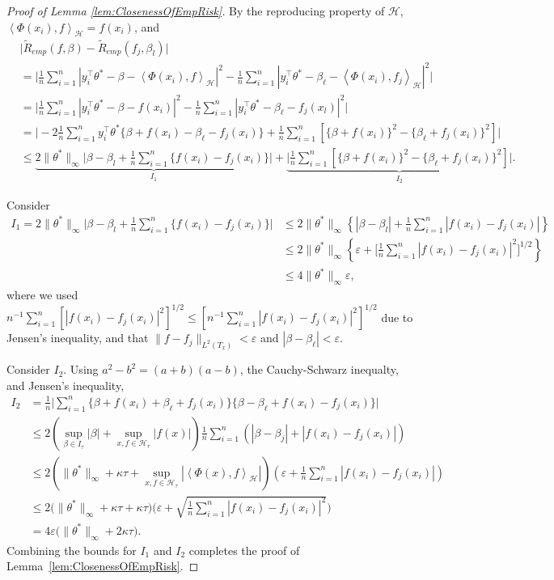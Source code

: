 \documentclass[twoside, onecolumn]{article}
\def\Hcal{\mathcal{H}}
\def\Hcal{\mathcal{H}}
\begin{document}
\begin{proof}[Proof of Lemma \ref{lem:ClosenessOfEmpRisk}]
By the reproducing property of $\Hcal$, $\left<\Phi(x_i), f\right>_\Hcal= f(x_i)$, and
\begin{align*}
&\Big|\widetilde R_{emp}(f, \beta) - \widetilde R_{emp}(f_j, \beta_l)\Big|\\
&=\Big|\frac{1}{n}\sum_{i=1}^{n}|y_i^{\top}\theta^*-\beta-\left<\Phi(x_i),f\right>_\Hcal|^{2}-\frac{1}{n}\sum_{i=1}^{n}|y_i^{\top}\theta^*-\beta_\ell-\left<\Phi(x_i),f_j\right>_\Hcal|^{2}\Big|\\
&=\Big|\frac{1}{n}\sum_{i=1}^{n}|y_i^{\top}\theta^*-\beta-f(x_i)|^{2}-\frac{1}{n}\sum_{i=1}^{n}|y_i^{\top}\theta^*-\beta_\ell-f_j(x_l)|^{2}\Big|\\
&=\Big|-2\frac{1}{n}\sum_{i=1}^{n}y_i^{\top}\theta^*\{\beta+ f(x_i)-\beta_\ell-f_j(x_i)\}+\frac{1}{n}\sum_{i=1}^n[\{\beta+f(x_i)\}^2-\{\beta_\ell+f_j(x_i)\}^{2}]\Big| \\
&\leq \underbrace{2\|\theta^*\|_{\infty}\Big|\beta-\beta_l+\frac1{n}\sum_{i=1}^{n}\{f(x_i)-f_j(x_i)\}\Big|}_{I_1}+\underbrace{\Big|\frac{1}{n}\sum_{i=1}^n[\{\beta+f(x_i)\}^2-\{\beta_\ell+f_j(x_i)\}^{2}] \Big|}_{I_2}.
\end{align*}

Consider 
\begin{align*}
I_1 = 2\|\theta^*\|_{\infty}\bigg|\beta-\beta_l+\frac1{n}\sum_{i=1}^{n}\{f(x_i)-f_j(x_i)\}\bigg|&\leq 2\|\theta^*\|_{\infty}\left\{|\beta -\beta_l|+\frac{1}{n}\sum_{i=1}^{n}|f(x_i)-f_j(x_i)|\right\}\\
&\leq 2\|\theta^*\|_{\infty}\left\{\varepsilon + \Big[\frac1{n}\sum_{i=1}^n|f(x_i)-f_j(x_i)|^2\Big]^{1/2}\right\}\\
&\leq 4\|\theta^*\|_{\infty}\varepsilon,
\end{align*}
where we used $n^{-1}\sum_{i=1}^{n}[|f(x_i)-f_j(x_i)|^2]^{1/2} \leq [n^{-1}\sum_{i=1}^n|f(x_i)-f_j(x_i)|^2]^{1/2}$ due to Jensen's inequality, and that $\|f-f_j\|_{L^2(T_x)}<\varepsilon$ and 
$|\beta-\beta_\ell|<\varepsilon$.

Consider $I_2$. Using $a^2-b^2=(a+b)(a-b)$, the Cauchy-Schwarz inequalty, and Jensen's inequality,
\begin{align*}
I_2 &= \frac{1}{n}\bigg|\sum_{i=1}^{n}\{\beta+f(x_i)+\beta_\ell+f_j(x_i)\}\{\beta-\beta_\ell+f(x_i)-f_j(x_i)\}\bigg|\\
&\leq 2(\sup_{\beta\in I_\tau}|\beta|+ \sup_{x,f\in \mathcal{H_\tau}}|f(x)|)\frac{1}{n}\sum_{i=1}^{n}(|\beta-\beta_j|+|f(x_i)-f_j(x_i)|)\\
&\leq 2(\|\theta^\ast\|_\infty +\kappa \tau+ \sup_{x,f\in \mathcal{H_\tau}}|\left< \Phi(x),f \right>_\Hcal|)(\varepsilon+\frac{1}{n}\sum_{i=1}^{n}|f(x_i)-f_j(x_i)|)\\
&\leq 2\bigg( 
\|\theta^\ast\|_\infty +\kappa \tau+\kappa \tau
\bigg)\bigg(\varepsilon+\sqrt{\frac{1}{n}\sum_{i=1}^{n}|f(x_i)-f_j(x_i)|^{2}}\bigg)\\
&=4\varepsilon \Big(\|\theta^\ast\|_\infty +2\kappa \tau \Big).
\end{align*}
Combining the bounds for $I_1$ and $I_2$ completes the proof of Lemma~\ref{lem:ClosenessOfEmpRisk}.
\end{proof}
\end{document}
